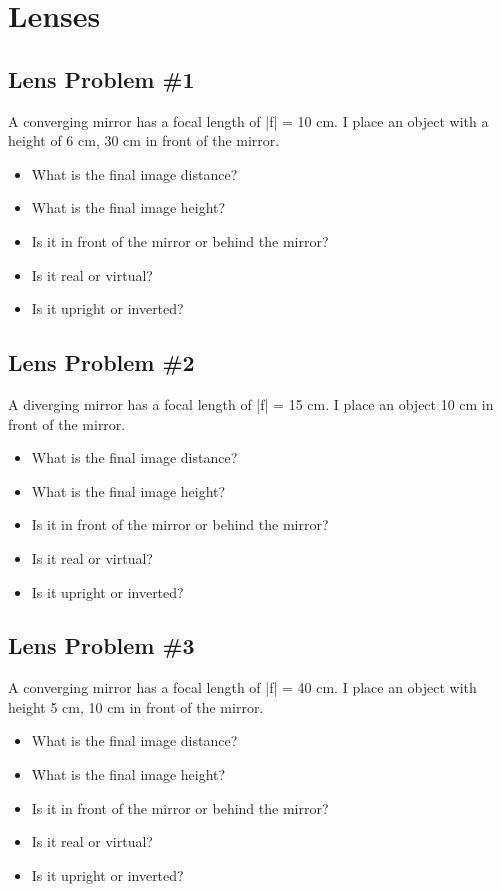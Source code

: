 \documentclass[11pt]{article}
\begin{document}
\pagebreak
\section{Lenses}

\subsection{Lens Problem \#1}
A converging mirror has a focal length of |f| = 10 cm.  I place an object with a height of 6 cm, 30 cm in front of the mirror.  

\begin{itemize}
\item What is the final image distance?
\item What is the final image height?
\item Is it in front of the mirror or behind the mirror?  
\item Is it real or virtual?
\item Is it upright or inverted?
\end{itemize}

\subsection{Lens Problem \#2}
A diverging mirror has a focal length of |f| = 15 cm.  I place an object 10 cm in front of the mirror.  

\begin{itemize}
\item What is the final image distance?
\item What is the final image height?
\item Is it in front of the mirror or behind the mirror?  
\item Is it real or virtual?
\item Is it upright or inverted?
\end{itemize}

\subsection{Lens Problem \#3}
A converging mirror has a focal length of |f| = 40 cm.  I place an object with height 5 cm, 10 cm in front of the mirror.  

\begin{itemize}
\item What is the final image distance?
\item What is the final image height?
\item Is it in front of the mirror or behind the mirror?  
\item Is it real or virtual?
\item Is it upright or inverted?
\end{itemize}
\end{document}
